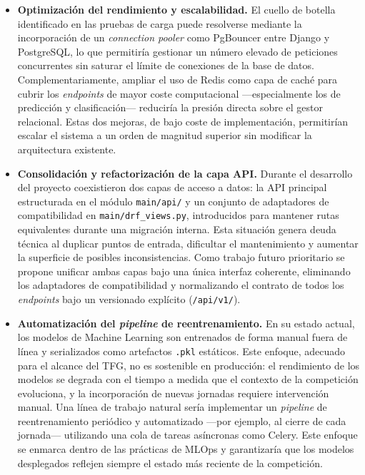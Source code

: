 \begin{itemize}

  \item \textbf{Optimización del rendimiento y escalabilidad.}
        El cuello de botella identificado en las pruebas de carga puede
        resolverse mediante la incorporación de un \textit{connection
        pooler} como PgBouncer entre Django y PostgreSQL, lo que
        permitiría gestionar un número elevado de peticiones concurrentes
        sin saturar el límite de conexiones de la base de datos.
        Complementariamente, ampliar el uso de Redis como capa de caché
        para cubrir los \textit{endpoints} de mayor coste computacional
        —especialmente los de predicción y clasificación— reduciría la
        presión directa sobre el gestor relacional. Estas dos mejoras,
        de bajo coste de implementación, permitirían escalar el sistema
        a un orden de magnitud superior sin modificar la arquitectura
        existente.

  \item \textbf{Consolidación y refactorización de la capa API.}
        Durante el desarrollo del proyecto coexistieron dos capas de
        acceso a datos: la API principal estructurada en el módulo
        \texttt{main/api/} y un conjunto de adaptadores de compatibilidad
        en \texttt{main/drf\_views.py}, introducidos para mantener rutas
        equivalentes durante una migración interna. Esta situación genera
        deuda técnica al duplicar puntos de entrada, dificultar el
        mantenimiento y aumentar la superficie de posibles
        inconsistencias. Como trabajo futuro prioritario se propone
        unificar ambas capas bajo una única interfaz coherente,
        eliminando los adaptadores de compatibilidad y normalizando el
        contrato de todos los \textit{endpoints} bajo un versionado
        explícito (\texttt{/api/v1/}).

  \item \textbf{Automatización del \textit{pipeline} de reentrenamiento.}
        En su estado actual, los modelos de Machine Learning son
        entrenados de forma manual fuera de línea y serializados como
        artefactos \texttt{.pkl} estáticos. Este enfoque, adecuado para
        el alcance del TFG, no es sostenible en producción: el
        rendimiento de los modelos se degrada con el tiempo a medida
        que el contexto de la competición evoluciona, y la incorporación
        de nuevas jornadas requiere intervención manual. Una línea de
        trabajo natural sería implementar un \textit{pipeline} de
        reentrenamiento periódico y automatizado —por ejemplo, al cierre
        de cada jornada— utilizando una cola de tareas asíncronas como
        Celery. Este enfoque se enmarca dentro de las prácticas de
        MLOps y garantizaría que los modelos desplegados reflejen
        siempre el estado más reciente de la competición.


\end{itemize}
